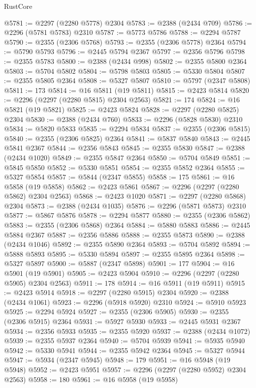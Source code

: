 \begin{lexlean}{RustCore}
\begin{coremodule}
@5781 := @2297 (@2280 @5778) @2304
@5783 := @2388 (@2434 @709)
@5786 := @2296 (@5781 @5783) @2310
@5787 := @5773 @5786
@5788 := @2294 @5787
@5790 := @2355 (@2306 @5768)
@5793 := @2355 (@2306 @5778) @2364
@5794 := @5790 @5793
@5796 := @2445 @5794 @2367
@5797 := @2356 @5796
@5798 := @2355 @5783
@5800 := @2388 (@2434 @998)
@5802 := @2355 @5800 @2364
@5803 := @5704 @5802
@5804 := @5798 @5803
@5805 := @5330 @5804
@5807 := @2355 @5805 @2364
@5808 := @5327 @5807
@5810 := @5797 (@2347 @5808)
@5811 := 173
@5814 := @16 @5811 (@19 @5811)
@5815 := @2423 @5814
@5820 := @2296 (@2297 (@2280 @5815) @2304 @2563)
@5821 := 174
@5824 := @16 @5821 (@19 @5821)
@5825 := @2423 @5824
@5828 := @2297 (@2280 @5825) @2304
@5830 := @2388 (@2434 @760)
@5833 := @2296 (@5828 @5830) @2310
@5834 := @5820 @5833
@5835 := @2294 @5834
@5837 := @2355 (@2306 @5815)
@5840 := @2355 (@2306 @5825) @2364
@5841 := @5837 @5840
@5843 := @2445 @5841 @2367
@5844 := @2356 @5843
@5845 := @2355 @5830
@5847 := @2388 (@2434 @1020)
@5849 := @2355 @5847 @2364
@5850 := @5704 @5849
@5851 := @5845 @5850
@5852 := @5330 @5851
@5854 := @2355 @5852 @2364
@5855 := @5327 @5854
@5857 := @5844 (@2347 @5855)
@5858 := 175
@5861 := @16 @5858 (@19 @5858)
@5862 := @2423 @5861
@5867 := @2296 (@2297 (@2280 @5862) @2304 @2563)
@5868 := @2423 @1020
@5871 := @2297 (@2280 @5868) @2304
@5873 := @2388 (@2434 @1035)
@5876 := @2296 (@5871 @5873) @2310
@5877 := @5867 @5876
@5878 := @2294 @5877
@5880 := @2355 (@2306 @5862)
@5883 := @2355 (@2306 @5868) @2364
@5884 := @5880 @5883
@5886 := @2445 @5884 @2367
@5887 := @2356 @5886
@5888 := @2355 @5873
@5890 := @2388 (@2434 @1046)
@5892 := @2355 @5890 @2364
@5893 := @5704 @5892
@5894 := @5888 @5893
@5895 := @5330 @5894
@5897 := @2355 @5895 @2364
@5898 := @5327 @5897
@5900 := @5887 (@2347 @5898)
@5901 := 177
@5904 := @16 @5901 (@19 @5901)
@5905 := @2423 @5904
@5910 := @2296 (@2297 (@2280 @5905) @2304 @2563)
@5911 := 178
@5914 := @16 @5911 (@19 @5911)
@5915 := @2423 @5914
@5918 := @2297 (@2280 @5915) @2304
@5920 := @2388 (@2434 @1061)
@5923 := @2296 (@5918 @5920) @2310
@5924 := @5910 @5923
@5925 := @2294 @5924
@5927 := @2355 (@2306 @5905)
@5930 := @2355 (@2306 @5915) @2364
@5931 := @5927 @5930
@5933 := @2445 @5931 @2367
@5934 := @2356 @5933
@5935 := @2355 @5920
@5937 := @2388 (@2434 @1072)
@5939 := @2355 @5937 @2364
@5940 := @5704 @5939
@5941 := @5935 @5940
@5942 := @5330 @5941
@5944 := @2355 @5942 @2364
@5945 := @5327 @5944
@5947 := @5934 (@2347 @5945)
@5948 := 179
@5951 := @16 @5948 (@19 @5948)
@5952 := @2423 @5951
@5957 := @2296 (@2297 (@2280 @5952) @2304 @2563)
@5958 := 180
@5961 := @16 @5958 (@19 @5958)

\end{coremodule}
\end{lexlean}
